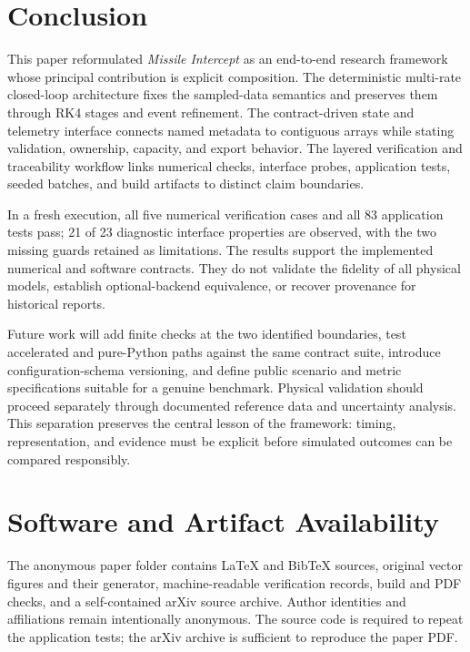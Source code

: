 \documentclass[11pt,a4paper]{article}
\begin{document}
\section{Conclusion}
This paper reformulated \emph{Missile Intercept} as an end-to-end research framework whose principal contribution is explicit composition. The deterministic multi-rate closed-loop architecture fixes the sampled-data semantics and preserves them through RK4 stages and event refinement. The contract-driven state and telemetry interface connects named metadata to contiguous arrays while stating validation, ownership, capacity, and export behavior. The layered verification and traceability workflow links numerical checks, interface probes, application tests, seeded batches, and build artifacts to distinct claim boundaries.

In a fresh execution, all five numerical verification cases and all 83 application tests pass; 21 of 23 diagnostic interface properties are observed, with the two missing guards retained as limitations. The results support the implemented numerical and software contracts. They do not validate the fidelity of all physical models, establish optional-backend equivalence, or recover provenance for historical reports.

Future work will add finite checks at the two identified boundaries, test accelerated and pure-Python paths against the same contract suite, introduce configuration-schema versioning, and define public scenario and metric specifications suitable for a genuine benchmark. Physical validation should proceed separately through documented reference data and uncertainty analysis. This separation preserves the central lesson of the framework: timing, representation, and evidence must be explicit before simulated outcomes can be compared responsibly.

\section*{Software and Artifact Availability}
The anonymous paper folder contains LaTeX and BibTeX sources, original vector figures and their generator, machine-readable verification records, build and PDF checks, and a self-contained arXiv source archive. Author identities and affiliations remain intentionally anonymous. The source code is required to repeat the application tests; the arXiv archive is sufficient to reproduce the paper PDF.



\end{document}
